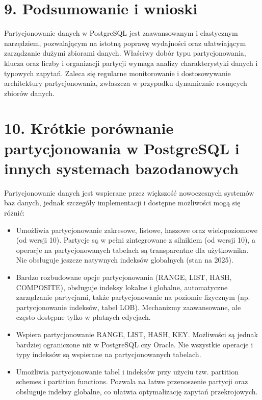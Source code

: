\documentclass[a4paper,11pt,polish]{sphinxmanual}
\begin{document}
\section{9. Podsumowanie i wnioski}
\label{\detokenize{rozdzial_1:podsumowanie-i-wnioski}}
\sphinxAtStartPar
Partycjonowanie danych w PostgreSQL jest zaawansowanym i elastycznym narzędziem, pozwalającym na istotną poprawę wydajności oraz ułatwiającym zarządzanie dużymi zbiorami danych. Właściwy dobór typu partycjonowania, klucza oraz liczby i organizacji partycji wymaga analizy charakterystyki danych i typowych zapytań. Zaleca się regularne monitorowanie i dostosowywanie architektury partycjonowania, zwłaszcza w przypadku dynamicznie rosnących zbiorów danych.


\section{10. Krótkie porównanie partycjonowania w PostgreSQL i innych systemach bazodanowych}
\label{\detokenize{rozdzial_1:krotkie-porownanie-partycjonowania-w-postgresql-i-innych-systemach-bazodanowych}}
\sphinxAtStartPar
Partycjonowanie danych jest wspierane przez większość nowoczesnych systemów baz danych, jednak szczegóły implementacji i dostępne możliwości mogą się różnić:
\begin{itemize}
\item {} 
\sphinxAtStartPar
{}
Umożliwia partycjonowanie zakresowe, listowe, haszowe oraz wielopoziomowe (od wersji 10). Partycje są w pełni zintegrowane z silnikiem (od wersji 10), a operacje na partycjonowanych tabelach są transparentne dla użytkownika. Nie obsługuje jeszcze natywnych indeksów globalnych (stan na 2025).

\item {} 
\sphinxAtStartPar
{}
Bardzo rozbudowane opcje partycjonowania (RANGE, LIST, HASH, COMPOSITE), obsługuje indeksy lokalne i globalne, automatyczne zarządzanie partycjami, także partycjonowanie na poziomie fizycznym (np. partycjonowanie indeksów, tabel LOB). Mechanizmy zaawansowane, ale często dostępne tylko w płatnych edycjach.

\item {} 
\sphinxAtStartPar
{}
Wspiera partycjonowanie RANGE, LIST, HASH, KEY. Możliwości są jednak bardziej ograniczone niż w PostgreSQL czy Oracle. Nie wszystkie operacje i typy indeksów są wspierane na partycjonowanych tabelach.

\item {} 
\sphinxAtStartPar
{}
Umożliwia partycjonowanie tabel i indeksów przy użyciu tzw. partition schemes i partition functions. Pozwala na łatwe przenoszenie partycji oraz obsługuje indeksy globalne, co ułatwia optymalizację zapytań przekrojowych.

\end{itemize}
\end{document}
